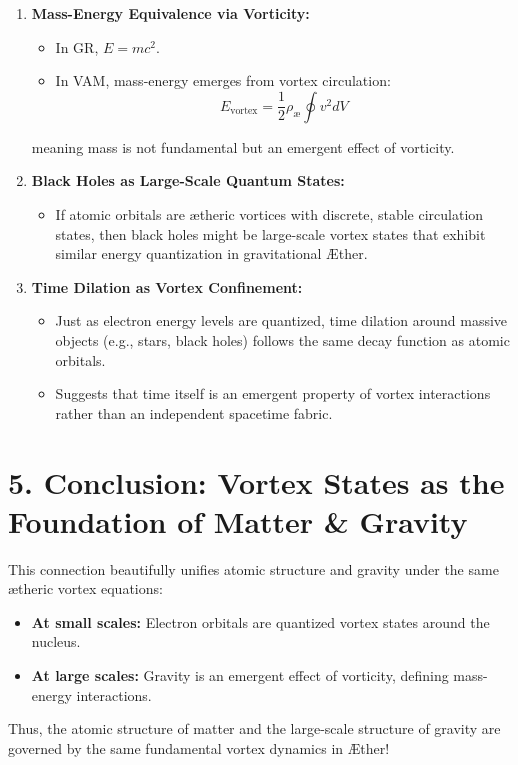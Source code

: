 \begin{enumerate}
    \item \textbf{Mass-Energy Equivalence via Vorticity:}
    \begin{itemize}
        \item In GR, \(E = mc^2\).
    \item In VAM, mass-energy emerges from vortex circulation:
        \[
        E_\text{vortex} = \frac{1}{2} \rho_\text{\ae} \oint v^2 dV
        \]
    \end{itemize}
    meaning mass is not fundamental but an emergent effect of vorticity.
    \item \textbf{Black Holes as Large-Scale Quantum States:}
    \begin{itemize}
    \item If atomic orbitals are ætheric vortices with discrete, stable circulation states, then black holes might be large-scale vortex states that exhibit similar energy quantization in gravitational Æther.
    \end{itemize}
    \item \textbf{Time Dilation as Vortex Confinement:}
    \begin{itemize}
    \item Just as electron energy levels are quantized, time dilation around massive objects (e.g., stars, black holes) follows the same decay function as atomic orbitals.
    \item Suggests that time itself is an emergent property of vortex interactions rather than an independent spacetime fabric.
    \end{itemize}
\end{enumerate}

\section*{5. Conclusion: Vortex States as the Foundation of Matter \& Gravity}

This connection beautifully unifies atomic structure and gravity under the same ætheric vortex equations:

\begin{itemize}
    \item \textbf{At small scales:} Electron orbitals are quantized vortex states around the nucleus.
    \item \textbf{At large scales:} Gravity is an emergent effect of vorticity, defining mass-energy interactions.
\end{itemize}

Thus, the atomic structure of matter and the large-scale structure of gravity are governed by the same fundamental vortex dynamics in Æther!